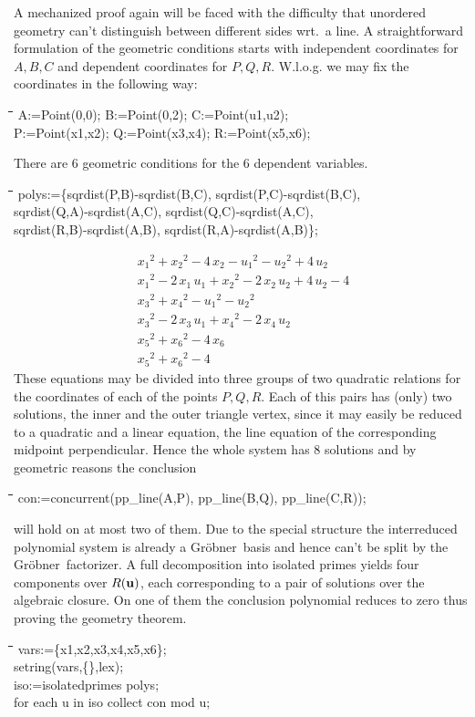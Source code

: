 \documentclass{article}
\newenvironment{code}{\tt \begin{tabbing}
\hspace*{1cm}\=\hspace*{1cm}\=\hspace*{1cm}\=
\hspace*{1cm}\=\hspace*{1cm}\=\kill
}{\end{tabbing}}
\newcommand{\formel}[1]{\[\begin{array}{l} #1\end{array}\]}
\newcommand{\uhh}{{\bf u}}
\newcommand{\gr}{{Gr\"obner}}
\begin{document}
A mechanized proof again will be faced with the difficulty that
unordered geometry can't distinguish between different sides wrt.\ a
line. A straightforward formulation of the geometric conditions starts
with independent coordinates for $A,B,C$ and dependent coordinates for
$P,Q,R$. W.l.o.g. we may fix the coordinates in the following way:
\begin{code}\+\>
A:=Point(0,0); B:=Point(0,2); C:=Point(u1,u2);\\
P:=Point(x1,x2); Q:=Point(x3,x4); R:=Point(x5,x6);
\end{code}
There are 6 geometric conditions for the 6 dependent variables.
\begin{code}\+\+
polys:=\{\>\>sqrdist(P,B)-sqrdist(B,C), sqrdist(P,C)-sqrdist(B,C),\\ 
	sqrdist(Q,A)-sqrdist(A,C), sqrdist(Q,C)-sqrdist(A,C),\\ 
	sqrdist(R,B)-sqrdist(A,B), sqrdist(R,A)-sqrdist(A,B)\};
\end{code}
\formel{
{x_1}^{2} +{x_2}^{2} -4\,x_2 -{u_1}^{2} -{u_2}^{2} +4\,u_2\\ 
{x_1}^{2} -2\,x_1\,u_1 +{ x_2}^{2} -2\,x_2\,u_2 +4\,u_2 -4\\ 
{x_3}^{2} +{x_4}^{2} -{u_1}^{2} -{u_2}^{2}\\ 
{x_3}^{2} -2\,x_3\,u_1 +{x_4}^{2} -2\,x_4\,u_2\\ 
{x_5}^{2} +{x_6}^{2} -4\,x_6\\ 
{x_5}^{2} +{x_6}^{2} -4}
These equations may be divided into three groups of two quadratic
relations for the coordinates of each of the points $P,Q,R$. Each of
this pairs has (only) two solutions, the inner and the outer triangle
vertex, since it may easily be reduced to a quadratic and a linear
equation, the line equation of the corresponding midpoint
perpendicular. Hence the whole system has 8 solutions and by geometric
reasons the conclusion
\begin{code}\>
con:=concurrent(pp\_line(A,P), pp\_line(B,Q), pp\_line(C,R));
\end{code}
will hold on at most two of them. Due to the special structure the
interreduced polynomial system is already a \gr\ basis and hence can't
be split by the \gr\ factorizer. A full decomposition into isolated
primes yields four components over $R(\uhh)$, each corresponding to a
pair of solutions over the algebraic closure. On one of them the
conclusion polynomial reduces to zero thus proving the geometry
theorem. 
\begin{code}\>\+
vars:=\{x1,x2,x3,x4,x5,x6\};\\
setring(vars,\{\},lex);\\
iso:=isolatedprimes polys;\\[6pt]

for each u in iso collect con mod u;
\end{code}
\end{document}
